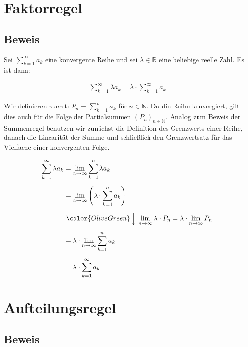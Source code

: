 \documentclass[fontsize=9pt,
               parskip=half-,
               DIV=14,
               listof=chapterentry,
               tocflat]{scrbook}
\begin{document}
\section{Faktorregel}

\subsection{Beweis}

\begin{theorem*}
Sei $\sum _{k=1}^{\infty }a_{k}$ eine konvergente Reihe und sei $\lambda \in \mathbb {R} $ eine beliebige reelle Zahl. Es ist dann:

\begin{align*}
\sum _{k=1}^{\infty }\lambda a_{k}=\lambda \cdot \sum _{k=1}^{\infty }a_{k}
\end{align*}

\end{theorem*}

\begin{proof*}
Wir definieren zuerst: $P_{n}=\sum _{k=1}^{n}a_{k}$ für $n\in \mathbb {N} $. Da die Reihe konvergiert, gilt dies auch für die Folge der Partialsummen $(P_{n})_{n\in \mathbb {N} }$. Analog zum Beweis der Summenregel benutzen wir zunächst die Definition des Grenzwerts einer Reihe, danach die Linearität der Summe und schließlich den Grenzwertsatz für das Vielfache einer konvergenten Folge.

\begin{align*}
\sum _{k=1}^{\infty }\lambda a_{k}&=\lim _{n\to \infty }\sum _{k=1}^{n}\lambda a_{k}\\[0.5em]&=\lim _{n\to \infty }\left(\lambda \cdot \sum _{k=1}^{n}a_{k}\right)\\[0.5em]&\ {\color {OliveGreen}\left\downarrow \ \lim _{n\to \infty }\lambda \cdot P_{n}=\lambda \cdot \lim _{n\to \infty }P_{n}\right.}\\[0.5em]&=\lambda \cdot \lim _{n\to \infty }\sum _{k=1}^{n}a_{k}\\[0.5em]&=\lambda \cdot \sum _{k=1}^{\infty }a_{k}
\end{align*}

\end{proof*}

\section{Aufteilungsregel}

\subsection{Beweis}
\end{document}
